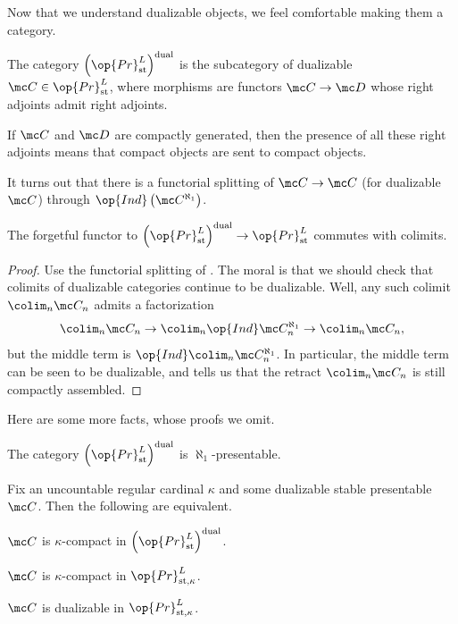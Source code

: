 \documentclass[../notes.tex]{subfiles}
\begin{document}
Now that we understand dualizable objects, we feel comfortable making them a category.
\begin{definition}
	The category $\left(\op{Pr}^L_{\mathrm{st}}\right)^{\mathrm{dual}}$ is the subcategory of dualizable $\mc C\in\op{Pr}^L_{\mathrm{st}}$, where morphisms are functors $\mc C\to\mc D$ whose right adjoints admit right adjoints.
\end{definition}
\begin{remark}
	If $\mc C$ and $\mc D$ are compactly generated, then the presence of all these right adjoints means that compact objects are sent to compact objects.
\end{remark}
\begin{remark} \label{rem:splitting-from-ind}
	It turns out that there is a functorial splitting of $\mc C\to\mc C$ (for dualizable $\mc C$) through $\op{Ind}\left(\mc C^{\aleph_1}\right)$.
\end{remark}
\begin{proposition}
	The forgetful functor to $\left(\op{Pr}^L_{\mathrm{st}}\right)^{\mathrm{dual}}\to\op{Pr}^L_{\mathrm{st}}$ commutes with colimits.
\end{proposition}
\begin{proof}
	Use the functorial splitting of . The moral is that we should check that colimits of dualizable categories continue to be dualizable. Well, any such colimit $\colim_n\mc C_n$ admits a factorization
	\[\colim_n\mc C_n\to\colim_n\op{Ind}\mc C_n^{\aleph_1}\to\colim_n\mc C_n,\]
	but the middle term is $\op{Ind}\colim_n\mc C_n^{\aleph_1}$. In particular, the middle term can be seen to be dualizable, and  tells us that the retract $\colim_n\mc C_n$ is still compactly assembled.
\end{proof}
Here are some more facts, whose proofs we omit.
\begin{proposition}
	The category $\left(\op{Pr}^L_{\mathrm{st}}\right)^{\mathrm{dual}}$ is $\aleph_1$-presentable.
\end{proposition}
\begin{proposition}
	Fix an uncountable regular cardinal $\kappa$ and some dualizable stable presentable $\mc C$. Then the following are equivalent.
	\begin{listroman}
		\item $\mc C$ is $\kappa$-compact in $\left(\op{Pr}^L_{\mathrm{st}}\right)^{\mathrm{dual}}$.
		\item $\mc C$ is $\kappa$-compact in $\op{Pr}^L_{\mathrm{st},\kappa}$.
		\item $\mc C$ is dualizable in $\op{Pr}^L_{\mathrm{st},\kappa}$.
	\end{listroman}
\end{proposition}
\end{document}

